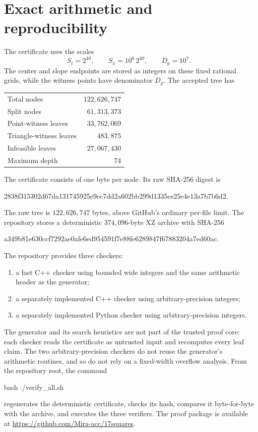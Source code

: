 \documentclass[11pt]{article}
\theoremstyle{definition}
\theoremstyle{remark}
\begin{document}
\section{Exact arithmetic and reproducibility}

The certificate uses the scales
\[
  S_t=2^{40},\qquad S_x=10^6\,2^{40},\qquad D_p=10^7.
\]
The center and slope endpoints are stored as integers on these fixed rational
grids, while the witness points have denominator $D_p$.  The accepted tree has
\begin{center}
\begin{tabular}{lr}
\toprule
Total nodes & $122{,}626{,}747$\\
Split nodes & $61{,}313{,}373$\\
Point-witness leaves & $33{,}762{,}069$\\
Triangle-witness leaves & $483{,}875$\\
Infeasible leaves & $27{,}067{,}430$\\
Maximum depth & $74$\\
\bottomrule
\end{tabular}
\end{center}
The certificate consists of one byte per node.  Its raw SHA-256 digest is
\begin{center}
\small\ttfamily
2838f315302d67da131745925e9ec7dd2a602bb299d1335ce25e4e13a7b7b6d2.
\end{center}
The raw tree is $122{,}626{,}747$ bytes, above GitHub's ordinary per-file
limit.  The repository stores a deterministic $374{,}096$-byte XZ archive with
SHA-256
\begin{center}
\small\ttfamily
a349b81e630ccf7292ae0afe6ed954591f7e88fe6289847f67883204a7ed60ac.
\end{center}

The repository provides three checkers:
\begin{enumerate}[leftmargin=2em]
  \item a fast C++ checker using bounded wide integers and the same arithmetic
    header as the generator;
  \item a separately implemented C++ checker using arbitrary-precision integers;
  \item a separately implemented Python checker using arbitrary-precision integers.
\end{enumerate}
The generator and its search heuristics are not part of the trusted proof core:
each checker reads the certificate as untrusted input and recomputes every leaf
claim.  The two arbitrary-precision checkers do not reuse the generator's
arithmetic routines, and so do not rely on a fixed-width overflow analysis.
From the repository root, the command
\begin{center}
\ttfamily bash ./verify\_all.sh
\end{center}
regenerates the deterministic certificate, checks its hash, compares it
byte-for-byte with the archive, and executes the three verifiers.  The proof
package is available at
\url{https://github.com/Mira-acc/17squares}.
\end{document}
